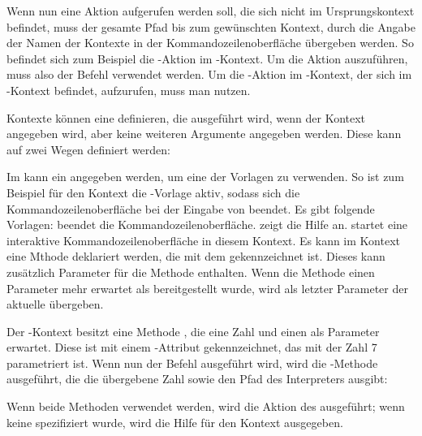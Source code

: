 Wenn nun eine Aktion aufgerufen werden soll, die sich nicht im Ursprungskontext befindet,
muss der gesamte Pfad bis zum gewünschten Kontext, durch die Angabe der Namen der Kontexte in der Kommandozeilenoberfläche übergeben werden.
So befindet sich zum Beispiel die -Aktion im -Kontext.
Um die Aktion auszuführen, muss also der Befehl  verwendet werden.
Um die -Aktion im -Kontext, der sich im -Kontext befindet,
aufzurufen, muss man  nutzen.

Kontexte können eine  definieren, die ausgeführt wird, wenn der Kontext angegeben wird, aber keine weiteren Argumente angegeben werden.
Diese kann auf zwei Wegen definiert werden:
\begin{outline}
 \1 Im  kann ein  angegeben werden, um eine der Vorlagen zu verwenden.
 So ist zum Beispiel für den  Kontext die -Vorlage aktiv,
 sodass sich die Kommandozeilenoberfläche bei der Eingabe von  beendet.
 Es gibt folgende Vorlagen:
 \2  beendet die Kommandozeilenoberfläche.
 \2  zeigt die Hilfe an.
 \2  startet eine interaktive Kommandozeilenoberfläche in diesem Kontext.
 \1 Es kann im Kontext eine Mthode deklariert werden, die mit dem  gekennzeichnet ist.
 Dieses kann zusätzlich Parameter für die Methode enthalten.
 Wenn die Methode einen Parameter mehr erwartet als bereitgestellt wurde, wird als letzter Parameter der aktuelle  übergeben.
 
 Der -Kontext besitzt eine Methode , die eine Zahl und einen  als Parameter erwartet.
 Diese ist mit einem -Attribut gekennzeichnet, das mit der Zahl 7 parametriert ist.
 Wenn nun der Befehl  ausgeführt wird, wird die -Methode ausgeführt, die die übergebene Zahl sowie den Pfad des Interpreters ausgibt:
\end{outline}
 Wenn beide Methoden verwendet werden, wird die Aktion des  ausgeführt;
 wenn keine spezifiziert wurde, wird die Hilfe für den Kontext ausgegeben.

